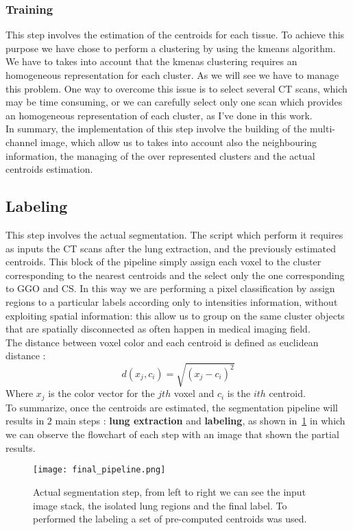 \documentclass{standalone}
\begin{document}
	\subsubsection*{Training}
	
	This step involves the estimation of the centroids for each tissue. To achieve this purpose we have chose to perform a clustering by using the kmeans algorithm. We have to takes into account that the kmenas clustering requires an homogeneous representation for each cluster. As we will see we have to manage this problem. One way to overcome this issue is to select several CT scans, which may be time consuming, or we can carefully select only one scan which provides an homogeneous representation of each cluster, as I've done in this work.\\
	In summary, the implementation of this step involve the building of the multi-channel image, which allow us to takes into account also the neighbouring information, the managing of the over represented clusters  and the actual centroids estimation.

	\subsection*{Labeling}
	
	This step involves the actual segmentation. The script which perform it requires as inputs the CT scans after the lung extraction, and the previously estimated centroids. This block of the pipeline simply assign each voxel to the cluster corresponding to the nearest centroids and the select only the one corresponding to GGO and CS. In this way we are performing a pixel classification by assign regions to a particular labels according only to intensities information, without exploiting spatial information: this allow us to group on the same cluster objects that are spatially disconnected as often happen in medical imaging field.\\
	The distance between voxel color and each centroid is defined as euclidean distance :
	\begin{equation*}
		d(x_j, c_i) = \sqrt{(x_j - c_i)^2}
	\end{equation*} 
	Where $x_j$ is the color vector for the $jth$ voxel and $c_i$ is the $ith$ centroid.\\
	
	To summarize, once the centroids are estimated, the segmentation pipeline will results in $2$ main steps : \textbf{lung extraction} and \textbf{labeling}, as shown in \figurename\,\ref{fig:FinalPipeline} in which we can observe the flowchart of each step with an image that shown the partial results.
	
	\begin{figure}
		\centering
			\texttt{[image: final\_pipeline.png]}
			\label{fig:FinalPipeline}\caption{Actual segmentation step, from left to right we can see the input image stack, the isolated lung regions and the final label. To performed the labeling a set of pre-computed centroids was used.}
	\end{figure}
	
	
	
\end{document}
